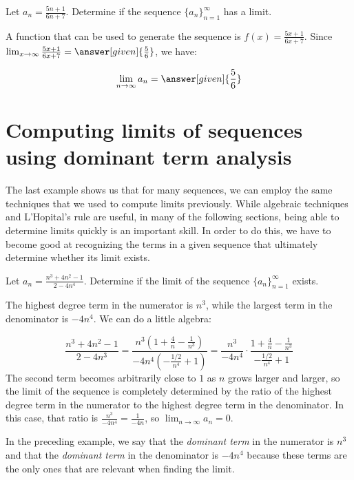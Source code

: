 \documentclass{ximera}
\begin{document}
\begin{example}
Let $a_n = \frac{5n+1}{6n+7}$.  Determine if the sequence $\{a_n\}_{n=1}^{\infty}$ has a limit.

\begin{explanation}
A function that can be used to generate the sequence is $f(x) = \frac{5x+1}{6x+7}$.  Since $\lim_{x \to \infty} \frac{5x+1}{6x+7} = \answer[given]{\frac{5}{6}}$, we have:

\[
\lim_{n \to \infty} a_n = \answer[given]{\frac{5}{6}}
\]
\end{explanation}

\end{example}

\section{Computing limits of sequences using dominant term analysis}
The last example shows us that for many sequences, we can employ the same techniques that we used to compute limits previously.  While algebraic techniques and L'Hopital's rule are useful, in many of the following sections, being able to determine limits quickly is an important skill.  In order to do this, we have to become good at recognizing the terms in a given sequence that ultimately determine whether its limit exists.

\begin{example}
Let $a_n = \frac{n^3+4n^2-1}{2-4n^4}$.  Determine if the limit of the sequence $\{a_n\}_{n=1}^{\infty}$ exists.

\begin{explanation}
The highest degree term in the numerator is $n^3$, while the largest term in the denominator is $-4n^4$.  We can do a little algebra:

\[
\frac{n^3+4n^2-1}{2-4n^3} = \frac{n^3\left(1+\frac{4}{n}-\frac{1}{n^3}\right)}{-4n^4\left(-\frac{1/2}{n^4}+1\right)} = \frac{n^3}{-4n^4} \cdot  \frac{1+\frac{4}{n}-\frac{1}{n^3}}{-\frac{1/2}{n^4}+1}
\]
The second term becomes arbitrarily close to $1$ as $n$ grows larger and larger, so the limit of the sequence is completely determined by the ratio of the highest degree term in the numerator to the highest degree term in the denominator.  In this case, that ratio is $\frac{n^3}{-4n^4} = \frac{1}{-4n}$, so $\lim_{n \to \infty} a_n = 0$.

\end{explanation}
\end{example}

\begin{remark}
In the preceding example, we say that the \emph{dominant term} in the numerator is $n^3$ and that the \emph{dominant term} in the denominator is $-4n^4$ because these terms are the only ones that are relevant when finding the limit.
\end{remark}
\end{document}
